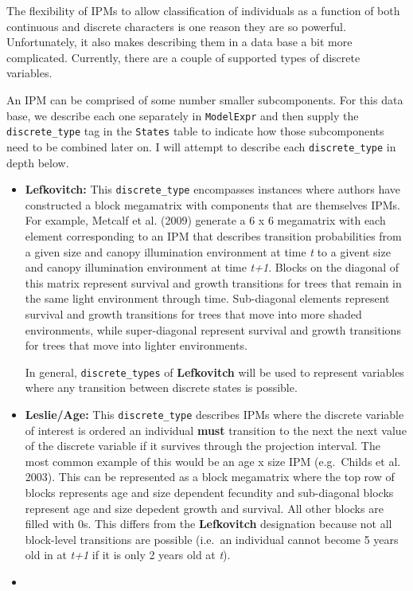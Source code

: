 \documentclass[]{article}
\begin{document}
The flexibility of IPMs to allow classification of individuals as a
function of both continuous and discrete characters is one reason they
are so powerful. Unfortunately, it also makes describing them in a data
base a bit more complicated. Currently, there are a couple of supported
types of discrete variables.

An IPM can be comprised of some number smaller subcomponents. For this
data base, we describe each one separately in \texttt{ModelExpr} and
then supply the \texttt{discrete\_type} tag in the \texttt{States} table
to indicate how those subcomponents need to be combined later on. I will
attempt to describe each \texttt{discrete\_type} in depth below.

\begin{itemize}
\item
  \textbf{Lefkovitch:} This \texttt{discrete\_type} encompasses
  instances where authors have constructed a block megamatrix with
  components that are themselves IPMs. For example, Metcalf et al.
  (2009) generate a 6 x 6 megamatrix with each element corresponding to
  an IPM that describes transition probabilities from a given size and
  canopy illumination environment at time \emph{t} to a givent size and
  canopy illumination environment at time \emph{t+1}. Blocks on the
  diagonal of this matrix represent survival and growth transitions for
  trees that remain in the same light environment through time.
  Sub-diagonal elements represent survival and growth transitions for
  trees that move into more shaded environments, while super-diagonal
  represent survival and growth transitions for trees that move into
  lighter environments.

  In general, \texttt{discrete\_types} of \textbf{Lefkovitch} will be
  used to represent variables where any transition between discrete
  states is possible.
\item
  \textbf{Leslie/Age:} This \texttt{discrete\_type} describes IPMs where
  the discrete variable of interest is ordered an individual
  \textbf{must} transition to the next the next value of the discrete
  variable if it survives through the projection interval. The most
  common example of this would be an age x size IPM (e.g.~Childs et al.
  2003). This can be represented as a block megamatrix where the top row
  of blocks represents age and size dependent fecundity and sub-diagonal
  blocks represent age and size depedent growth and survival. All other
  blocks are filled with 0s. This differs from the \textbf{Lefkovitch}
  designation because not all block-level transitions are possible
  (i.e.~an individual cannot become 5 years old in at \emph{t+1} if it
  is only 2 years old at \emph{t}).
\item
\end{itemize}
\end{document}
